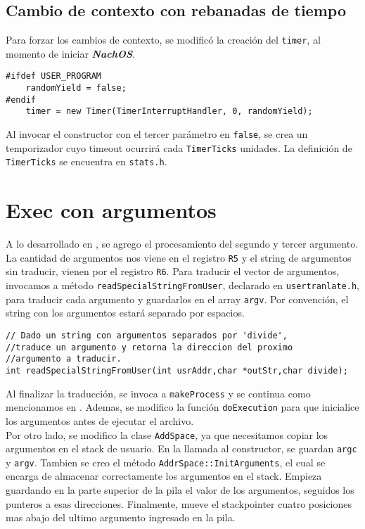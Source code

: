 \subsection*{Cambio de contexto con rebanadas de tiempo}
Para forzar los cambios de contexto, se modificó la creación del \texttt{timer}, al momento de iniciar \textit{\textbf{NachOS}}.
\begin{lstlisting}[style=C]
#ifdef USER_PROGRAM
    randomYield = false;
#endif
    timer = new Timer(TimerInterruptHandler, 0, randomYield);
\end{lstlisting}
Al invocar el constructor con  el tercer parámetro en \texttt{false}, se crea un temporizador cuyo timeout ocurrirá cada \texttt{TimerTicks} unidades. La definición de \texttt{TimerTicks} se encuentra en \texttt{stats.h}.
\section{Exec con argumentos}
A lo desarrollado en , se agrego el procesamiento del segundo y tercer argumento. La cantidad de argumentos nos viene en el registro \texttt{R5} y el string de argumentos sin traducir, vienen por el registro \texttt{R6}. Para traducir el vector de argumentos, invocamos a método \texttt{readSpecialStringFromUser}, declarado en \texttt{usertranlate.h}, para traducir cada argumento y guardarlos en el array \texttt{argv}. Por convención, el string con los argumentos estará separado por espacios.
\begin{lstlisting}[style=C]
// Dado un string con argumentos separados por 'divide',
//traduce un argumento y retorna la direccion del proximo
//argumento a traducir.
int readSpecialStringFromUser(int usrAddr,char *outStr,char divide);
\end{lstlisting}
Al finalizar la traducción, se invoca a \texttt{makeProcess} y se continua como mencionamos en . Ademas, se modifico la función \texttt{doExecution} para que inicialice los argumentos antes de ejecutar el archivo.\\
Por otro lado, se modifico la clase \texttt{AddSpace}, ya que necesitamos copiar los argumentos en el stack de usuario. En la llamada al constructor, se guardan \texttt{argc} y \texttt{argv}. Tambien se creo el método \texttt{AddrSpace::InitArguments}, el cual se encarga de almacenar correctamente los argumentos en el stack. Empieza guardando en la parte superior de la pila el valor de los argumentos, seguidos los punteros a esas direcciones. Finalmente, mueve el stackpointer cuatro posiciones mas abajo del ultimo argumento ingresado en la pila. 
